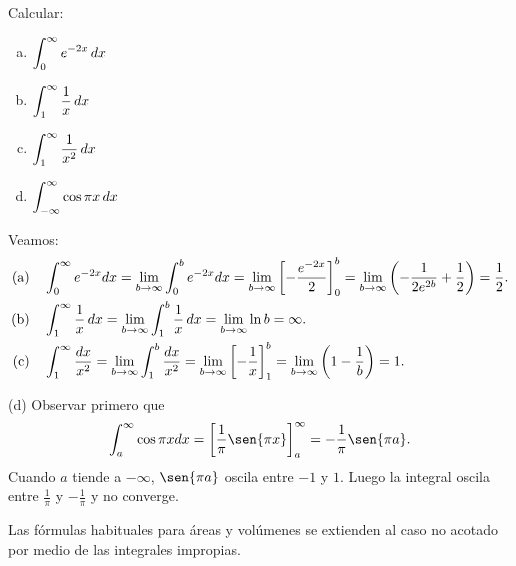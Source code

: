 \begin{example}
  Calcular:
  \begin{multicols}{2}
    \begin{enumerate}[(a)]
      \item $\displaystyle \int_0^\infty e^{-2x} \,dx$
      \item $\displaystyle \int_1^\infty \frac{1}{x} \,dx$
      \item $\displaystyle \int_1^\infty \frac{1}{x^2} \,dx$
      \item $\displaystyle  \int_{-\infty}^\infty \cos{\pi x} \,dx $
    \end{enumerate}
  \end{multicols}

  Veamos: 
  \begin{align*}
    \text{(a)}\quad&
    \int_0^\infty e^{-2x} dx 
    = \lim_{b \to \infty} \int_0^b e^{-2x} dx 
    = \lim_{b \to \infty} \left[-\frac{e^{-2x}}{2}\right]_0^b 
    = \lim_{b \to \infty} \left(-\frac{1}{2e^{2b}} + \frac{1}{2}\right) 
    = \frac{1}{2}.
    \\
    \text{(b)}\quad&
    \int_1^\infty \frac{1}{x}\,dx = \lim_{b \to \infty} \int_1^b \frac{1}{x}\,dx = \lim_{b \to \infty} \ln{b} = \infty.
    \\
    \text{(c)}\quad&
    \int_1^\infty \frac{dx}{x^2} = \lim_{b \to \infty} \int_1^b \frac{dx}{x^2} = \lim_{b \to \infty} \left[-\frac{1}{x}\right]_1^b = \lim_{b \to \infty} \left(1 - \frac{1}{b}\right) = 1.
  \end{align*}

  (d) Observar primero que
  \[
\int_a^\infty \cos{\pi x} dx = \left[\frac{1}{\pi}\sen{\pi x}\right]_a^\infty = -\frac{1}{\pi}\sen{\pi a}.
\]
Cuando $a$ tiende a $-\infty$, $\sen{\pi a}$ oscila entre $-1$ y $1$.
Luego la integral oscila entre $\frac{1}{\pi}$ y $-\frac{1}{\pi}$ y no converge.
\end{example}

Las fórmulas habituales para áreas y volúmenes se extienden al caso no acotado por medio de
las integrales impropias.

